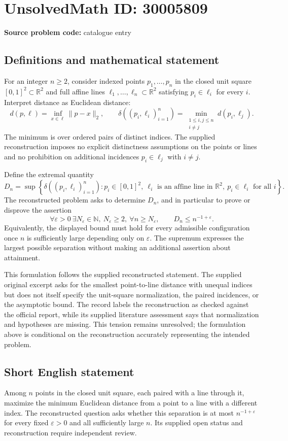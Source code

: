 \documentclass[11pt]{article}
\newcommand{\N}{\mathbb{N}}
\newcommand{\R}{\mathbb{R}}
\begin{document}
\section*{UnsolvedMath ID: 30005809}
\textbf{Source problem code:} catalogue entry
\subsection{Definitions and mathematical statement}
For an integer \(n\geq 2\), consider indexed points \(p_1,\ldots,p_n\) in the closed unit square \([0,1]^2\subset\R^2\) and full affine lines \(\ell_1,\ldots,\ell_n\subset\R^2\) satisfying \(p_i\in\ell_i\) for every \(i\). Interpret distance as Euclidean distance:
\[
d(p,\ell)=\inf_{x\in\ell}\|p-x\|_2,
\qquad
\delta((p_i,\ell_i)_{i=1}^n)=\min_{\substack{1\leq i,j\leq n\\i\ne j}}d(p_i,\ell_j).
\]
The minimum is over ordered pairs of distinct indices. The supplied reconstruction imposes no explicit distinctness assumptions on the points or lines and no prohibition on additional incidences \(p_i\in\ell_j\) with \(i\ne j\).

Define the extremal quantity
\[
D_n=\sup\left\{\delta((p_i,\ell_i)_{i=1}^n):p_i\in[0,1]^2,\ \ell_i\text{ is an affine line in }\R^2,\ p_i\in\ell_i\text{ for all }i\right\}.
\]
The reconstructed problem asks to determine \(D_n\), and in particular to prove or disprove the assertion
\[
\forall\varepsilon>0\ \exists N_{\varepsilon}\in\N,\ N_{\varepsilon}\geq2,\ \forall n\geq N_{\varepsilon},\qquad D_n\leq n^{-1+\varepsilon}.
\]
Equivalently, the displayed bound must hold for every admissible configuration once \(n\) is sufficiently large depending only on \(\varepsilon\). The supremum expresses the largest possible separation without making an additional assertion about attainment.

This formulation follows the supplied reconstructed statement. The supplied original excerpt asks for the smallest point-to-line distance with unequal indices but does not itself specify the unit-square normalization, the paired incidences, or the asymptotic bound. The record labels the reconstruction as checked against the official report, while its supplied literature assessment says that normalization and hypotheses are missing. This tension remains unresolved; the formulation above is conditional on the reconstruction accurately representing the intended problem.
\subsection{Short English statement}
Among \(n\) points in the closed unit square, each paired with a line through it, maximize the minimum Euclidean distance from a point to a line with a different index. The reconstructed question asks whether this separation is at most \(n^{-1+\varepsilon}\) for every fixed \(\varepsilon>0\) and all sufficiently large \(n\). Its supplied open status and reconstruction require independent review.
\end{document}
